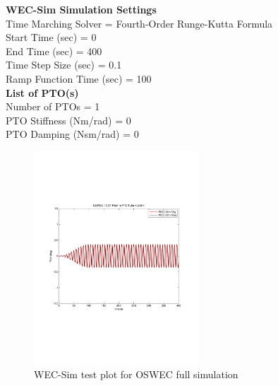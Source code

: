 \textbf{WEC-Sim Simulation Settings} \\ 
	Time Marching Solver                 = Fourth-Order Runge-Kutta Formula \\ 
	Start Time                     (sec) = 0  \\
	End Time                       (sec) = 400  \\
	Time Step Size                 (sec) = 0.1 \\
	Ramp Function Time             (sec) = 100 \\

\textbf{List of PTO(s)} \\
	Number of PTOs = 1 \\
	PTO Stiffness           (Nm/rad) = 0 \\
	PTO Damping           (Nsm/rad) = 0 \\

        \begin{figure}[H]
        \centering
        \includegraphics[width=0.55\textwidth]{application/images/OSWEC_Test}
        \caption{WEC-Sim test plot for OSWEC full simulation}
        \label{OSWEC_Test}
        \end{figure}

\clearpage
